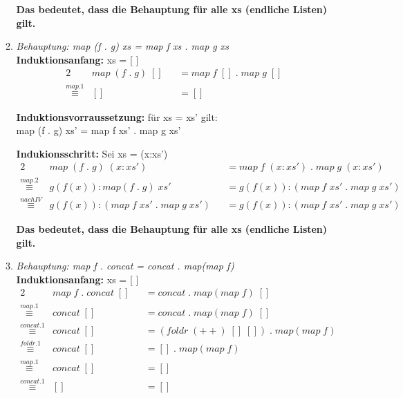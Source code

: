 \documentclass[11pt]{article}
\begin{document}
\begin{enumerate}
\begin{enumerate}
\vspace*{0.5cm}
\textbf{Das bedeutet, dass die Behauptung für alle xs (endliche Listen) gilt.}

\vspace*{0.5cm}
\item
\textit{Behauptung: map (f . g) xs = map f xs . map g xs}\\
\textbf{Induktionsanfang:} xs = [ ]
\begin{alignat*}{2}
&map\phantom{.}(f\phantom{.}.\phantom{.}g)\phantom{.}[]&&=map\phantom{.}f\phantom{.}[]\phantom{.}.\phantom{.}map\phantom{.}g\phantom{.}[]\\
\stackrel{map.1}{\equiv}&[]&&=[]
\end{alignat*}

\vspace*{0.5cm}
\textbf{Induktionsvorraussetzung:} für xs = xs' gilt:\\
map (f . g) xs' = map f xs' . map g xs'

\vspace*{0.5cm}
\textbf{Indukionsschritt:} Sei xs = (x:xs')
\begin{alignat*}{2}
&map\phantom{.}(f\phantom{.}.\phantom{.}g)\phantom{.}(x:xs')&&=map\phantom{.}f\phantom{.}(x:xs')\phantom{.}.\phantom{.}map\phantom{.}g\phantom{.}(x:xs')\\
\stackrel{map.2}{\equiv}&g(f(x)):map(f\phantom{.}.\phantom{.}g)\phantom{.}xs'&&=g(f(x)):(map\phantom{.}f\phantom{.}xs'\phantom{.}.\phantom{.}map\phantom{.}g\phantom{.}xs')\\
\stackrel{nach IV}{\equiv}&g(f(x)):(map\phantom{.}f\phantom{.}xs'\phantom{.}.\phantom{.}map\phantom{.}g\phantom{.}xs')&&=g(f(x)):(map\phantom{.}f\phantom{.}xs'\phantom{.}.\phantom{.}map\phantom{.}g\phantom{.}xs')
\end{alignat*}

\vspace*{0.5cm}
\textbf{Das bedeutet, dass die Behauptung für alle xs (endliche Listen) gilt.}
\newpage
\vspace*{0.5cm}

\item
\textit{Behauptung: map f . concat = concat . map(map f)}\\
\textbf{Induktionsanfang:} xs = [ ]
\begin{alignat*}{2}
&map\phantom{.}f\phantom{.}.\phantom{.}concat\phantom{.}[]&&=concat\phantom{.}.\phantom{.}map(map\phantom{.}f)\phantom{.}[]\\
\stackrel{map.1}{\equiv}&concat\phantom{.}[]&&=concat\phantom{.}.\phantom{.}map(map\phantom{.}f)\phantom{.}[]\\
\stackrel{concat.1}{\equiv}&concat\phantom{.}[]&&=(foldr\phantom{.}(++)\phantom{.}[]\phantom{.}[])\phantom{.}.\phantom{.}map(map\phantom{.}f)\\
\stackrel{foldr.1}{\equiv}&concat\phantom{.}[]&&=[]\phantom{.}.\phantom{.}map(map\phantom{.}f)\\
\stackrel{map.1}{\equiv}&concat\phantom{.}[]&&=[]\\
\stackrel{concat.1}{\equiv}&[]&&=[]
\end{alignat*}


\end{enumerate}
\end{enumerate}
\end{document}
